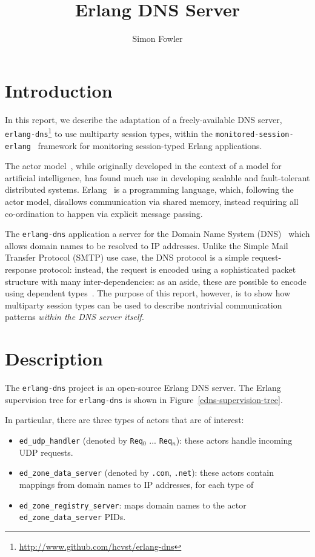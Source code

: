 \documentclass[a4paper]{article}
\title{Erlang DNS Server}
\author{Simon Fowler}
\newcommand{\mse}[0]{\texttt{monitored-session-erlang}}
\begin{document}
\maketitle

\section{Introduction}
In this report, we describe the adaptation of a freely-available DNS server, \texttt{erlang-dns}\footnote{\url{http://www.github.com/hcvst/erlang-dns}} to use multiparty session types, within the \mse{}~\cite{fowler:msc} framework for monitoring session-typed Erlang applications.

The actor model~\cite{agha:actors,hewitt:actors}, while originally developed in the context of a model for artificial intelligence, has found much use in developing scalable and fault-tolerant distributed systems. Erlang~\cite{armstrong:erlang} is a programming language, which, following the actor model, disallows communication via shared memory, instead requiring all co-ordination to happen via explicit message passing. 

The \texttt{erlang-dns} application a server for the Domain Name System (DNS)~\cite{rfc1035,rfc2535} which allows domain names to be resolved to IP addresses.
Unlike the Simple Mail Transfer Protocol (SMTP) use case, the DNS protocol is a simple request-response protocol: instead, the request is encoded using a sophisticated packet structure with many inter-dependencies: as an aside, these are possible to encode using dependent types~\cite{fowler:bsc}. The purpose of this report, however, is to show how multiparty session types can be used to describe nontrivial communication patterns \emph{within the DNS server itself}.

\section{Description}
The \texttt{erlang-dns} project is an open-source Erlang DNS server. The Erlang supervision tree for \texttt{erlang-dns} is shown in Figure~\ref{edns-supervision-tree}.

In particular, there are three types of actors that are of interest:

\begin{itemize}
\item \texttt{ed\_udp\_handler} (denoted by \texttt{Req$_0$} ... \texttt{Req$_n$}): these actors handle incoming UDP requests.
\item \texttt{ed\_zone\_data\_server} (denoted by \texttt{.com}, \texttt{.net}): these actors contain mappings from domain names to IP addresses, for each type of 
\item \texttt{ed\_zone\_registry\_server}: maps domain names to the actor \texttt{ed\_zone\_data\_server} PIDs.
\end{itemize}
\end{document}
